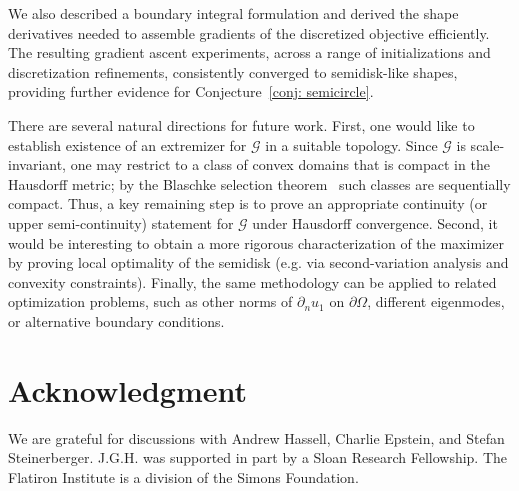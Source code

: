 \documentclass{amsart}
\theoremstyle{plain}
\begin{document}
We also described a boundary integral formulation and derived the shape derivatives needed to assemble gradients of the discretized objective efficiently.
The resulting gradient ascent experiments, across a range of initializations and discretization refinements, consistently converged to semidisk-like shapes, providing further evidence for Conjecture~\ref{conj: semicircle}.

There are several natural directions for future work.
First, one would like to establish existence of an extremizer for $\mathcal{G}$ in a suitable topology.
Since $\mathcal{G}$ is scale-invariant, one may restrict to a class of convex domains that is compact in the Hausdorff metric; by the Blaschke selection theorem~\cite{blaschke1916kreis} such classes are sequentially compact.
Thus, a key remaining step is to prove an appropriate continuity (or upper semi-continuity) statement for $\mathcal{G}$ under Hausdorff convergence.
Second, it would be interesting to obtain a more rigorous characterization of the maximizer by proving local optimality of the semidisk (e.g. via second-variation analysis and convexity constraints).
Finally, the same methodology can be applied to related optimization problems, such as other norms of $\partial_n u_1$ on $\partial\Omega$, different eigenmodes, or alternative boundary conditions.

\section*{Acknowledgment}
We are grateful for discussions with Andrew Hassell, Charlie Epstein, and Stefan Steinerberger.
J.G.H. was supported in part by a Sloan Research Fellowship. 
The Flatiron Institute is a division of the Simons Foundation.

\clearpage
\newpage


\end{document}
